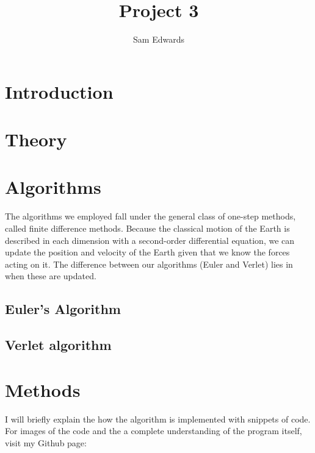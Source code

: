 \documentclass[10pt,showpacs,preprintnumbers,footinbib,amsmath,amssymb,aps,prl,twocolumn,groupedaddress,superscriptaddress,showkeys]{revtex4-1}
\begin{document}
\title{Project 3}
\author{Sam Edwards}
\begin{abstract}

\end{abstract}
\maketitle

\section{Introduction}


\section{Theory}
	
\section{Algorithms}

The algorithms we employed fall under the general class of one-step methods, called finite difference methods. Because the classical motion of the Earth is described in each dimension with a second-order differential equation, we can update the position and velocity of the Earth given that we know the forces acting on it. The difference between our algorithms (Euler and Verlet) lies in when these are updated.

\subsection{Euler's Algorithm}



\subsection{Verlet algorithm}



\section{Methods}

I will briefly explain the how the algorithm is implemented with snippets of code. For images of the code and the a complete understanding of the program itself, visit my Github page: %
\end{document}

